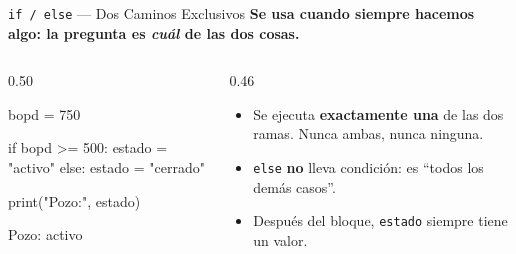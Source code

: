 \documentclass[aspectratio=169, 11pt]{beamer}
\begin{document}
\begin{frame}[fragile,shrink=8]{\texttt{if / else} --- Dos Caminos Exclusivos}
  \vspace{-4pt}
  {\small\color{arcaDark}\bfseries
    Se usa cuando \textbf{siempre} hacemos algo: la pregunta es \textit{cuál} de las dos cosas.}

  \vspace{6pt}
  \begin{columns}[T]
    \begin{column}{0.50\textwidth}
      \begin{pyblock}
bopd = 750

if bopd >= 500:
    estado = "activo"
else:
    estado = "cerrado"

print("Pozo:", estado)
      \end{pyblock}
      \vspace{2pt}
      \begin{outputblock}
Pozo: activo
      \end{outputblock}
    \end{column}

    \begin{column}{0.46\textwidth}
      {\scriptsize\color{textMuted}
      \begin{itemize}\setlength{\itemsep}{5pt}
        \item[{\color{arcaRed}\scriptsize\faArrowRight}]
          Se ejecuta \textbf{exactamente una} de las
          dos ramas. Nunca ambas, nunca ninguna.
        \item[{\color{arcaRed}\scriptsize\faArrowRight}]
          \texttt{else} \textbf{no} lleva condición:
          es ``todos los demás casos''.
        \item[{\color{arcaRed}\scriptsize\faArrowRight}]
          Después del bloque, \texttt{estado}
          siempre tiene un valor.
      \end{itemize}
      }
    \end{column}
  \end{columns}
\end{frame}
\end{document}
